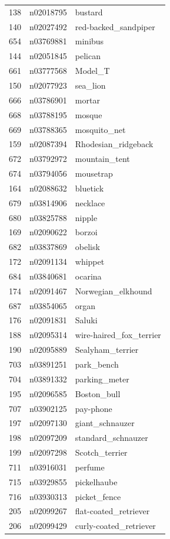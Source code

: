 \begin{table}
\begin{tabular}{cll}
138 & n02018795 & bustard \\
140 & n02027492 & red-backed_sandpiper \\
654 & n03769881 & minibus \\
144 & n02051845 & pelican \\
661 & n03777568 & Model_T \\
150 & n02077923 & sea_lion \\
666 & n03786901 & mortar \\
668 & n03788195 & mosque \\
669 & n03788365 & mosquito_net \\
159 & n02087394 & Rhodesian_ridgeback \\
672 & n03792972 & mountain_tent \\
674 & n03794056 & mousetrap \\
164 & n02088632 & bluetick \\
679 & n03814906 & necklace \\
680 & n03825788 & nipple \\
169 & n02090622 & borzoi \\
682 & n03837869 & obelisk \\
172 & n02091134 & whippet \\
684 & n03840681 & ocarina \\
174 & n02091467 & Norwegian_elkhound \\
687 & n03854065 & organ \\
176 & n02091831 & Saluki \\
188 & n02095314 & wire-haired_fox_terrier \\
190 & n02095889 & Sealyham_terrier \\
703 & n03891251 & park_bench \\
704 & n03891332 & parking_meter \\
195 & n02096585 & Boston_bull \\
707 & n03902125 & pay-phone \\
197 & n02097130 & giant_schnauzer \\
198 & n02097209 & standard_schnauzer \\
199 & n02097298 & Scotch_terrier \\
711 & n03916031 & perfume \\
715 & n03929855 & pickelhaube \\
716 & n03930313 & picket_fence \\
205 & n02099267 & flat-coated_retriever \\
206 & n02099429 & curly-coated_retriever \\

\end{tabular}
\end{table}
